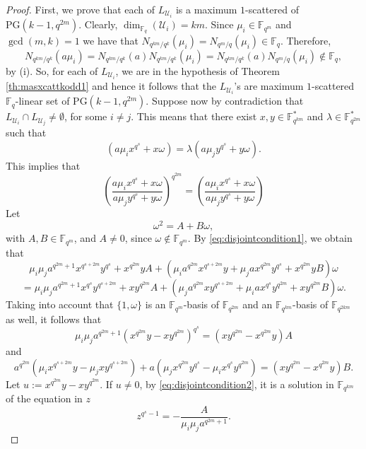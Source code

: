 \documentclass[11pt]{amsart}
\theoremstyle{definition}
\newcommand{\F}{{\mathbb F}}
\newcommand{\U}{{\mathcal{U}}}
\newcommand{\PG}{\mathrm{PG}}
\begin{document}
{\begin{proof}
First, we prove that each of $L_{\U_i}$ is a maximum $1$-scattered of $\PG(k-1,q^{2m})$. Clearly, $\dim_{\F_q}(\U_i)=km$. Since $\mu_i \in \F_{q^m}$ and $\gcd(m,k)=1$ we have that $N_{q^{km}/q^k}(\mu_i)=N_{q^{m}/q}(\mu_i) \in \F_q$. Therefore,
\[
N_{q^{km}/q^k}(a\mu_i)=N_{q^{km}/q^k}(a)N_{q^{km}/q^k}(\mu_i)=N_{q^{km}/q^k}(a)N_{q^{m}/q}(\mu_i)
\notin \F_q,\]
by (i). So, for each of $L_{\U_i}$, we are in the hypothesis of Theorem \ref{th:masxcattkodd1} and hence it follows that the $L_{\U_i}$'s are maximum $1$-scattered $\F_q$-linear set of $\PG(k-1,q^{2m})$. \newline
Suppose now by contradiction that $L_{\U_i} \cap L_{\U_j} \neq \emptyset$, for some $i \neq j$. This means that there exist $x,y \in \F_{q^{km}}^*$ and $\lambda \in \F_{q^{2m}}^*$ such that 
\[
(a\mu_ix^{q^s}+x\omega)=\lambda(a\mu_jy^{q^s}+y\omega).
\]
This implies that 
\begin{equation} \label{eq:disjointcondition1}
\left( \frac{a\mu_ix^{q^s}+x\omega}{a\mu_jy^{q^s}+y\omega}\right)^{q^{2m}}= \left( \frac{a\mu_ix^{q^s}+x\omega}{a\mu_jy^{q^s}+y\omega}\right)
\end{equation}
Let 
\[
\omega^2=A+B\omega, 
\]
with $A,B \in \F_{q^m}$, and $A \neq 0$, since $\omega \notin \F_{q^m}$. By \eqref{eq:disjointcondition1}, we obtain that
\[
\mu_i\mu_ja^{q^{2m}+1} x^{q^{s+2m}}y^{q^s}+x^{q^{2m}}yA+(\mu_ia^{q^{2m}} x^{q^{s+2m}}y+\mu_jax^{q^{2m}} y^{q^s}+ x^{q^{2m}}yB ) \omega
\]
\[
=\mu_i\mu_ja^{q^{2m}+1} x^{q^s}y^{q^{s+2m}}+ xy^{q^{2m}}A+(\mu_ja^{q^{2m}} xy^{q^{s+2m}}+\mu_iax^{q^s}y^{q^{2m}}+ xy^{q^{2m}}B)\omega.
\]
Taking into account that $\{1,\omega\}$ is an $\F_{q^m}$-basis of $\F_{q^{2m}}$ and an $\F_{q^{km}}$-basis of $\F_{q^{2km}}$ as well, it follows that 
\begin{equation} \label{eq:disjointcondition2}
    \mu_i\mu_ja^{q^{2m}+1} (x^{q^{2m}}y-xy^{q^{2m}})^{q^s}=(xy^{q^{2m}}-x^{q^{2m}}y)A
\end{equation}
and 
\begin{equation} \label{eq:disjointcondition3}
    a^{q^{2m}}(\mu_ix^{q^{s+2m}}y-\mu_jxy^{q^{s+2m}})+a(\mu_jx^{q^{2m}} y^{q^s}-\mu_ix^{q^s}y^{q^{2m}})=(xy^{q^{2m}}-x^{q^{2m}}y)B.
\end{equation}
Let $u:=x^{q^{2m}}y-xy^{q^{2m}}$. If $u \neq 0$, by \eqref{eq:disjointcondition2}, it is a solution in $\F_{q^{km}}$ of the equation in $z$
\[
z^{q^s-1}=-\frac{A}{\mu_i\mu_ja^{q^{2m}+1}}.
\]


\end{proof}}
\end{document}
